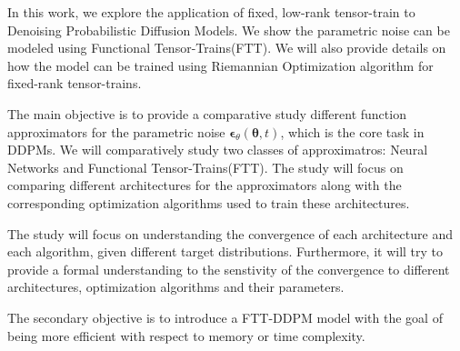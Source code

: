 \documentclass[11pt]{article}
\begin{document}
    In this work, we explore the application of fixed, low-rank tensor-train to Denoising Probabilistic Diffusion Models.
    We show the parametric noise can be modeled using Functional Tensor-Trains(FTT).
    We will also provide details on how the model can be trained using Riemannian Optimization algorithm for fixed-rank
    tensor-trains.\par
    The main objective is to provide a comparative study different function approximators for the
    parametric noise $\bm{\epsilon}_{\theta}(\bm{\theta},t)$, which is the core task in DDPMs.
    We will comparatively study two classes of approximatros: Neural Networks and Functional Tensor-Trains(FTT).
    The study will focus on comparing different architectures for the approximators along with the corresponding
    optimization algorithms used to train these architectures.\par

    The study will focus on understanding the convergence of each architecture and each algorithm, given different
    target distributions.
    Furthermore, it will try to provide a formal understanding to the senstivity of the convergence
    to different architectures, optimization algorithms and their parameters.

    The secondary objective is to introduce a FTT-DDPM model with the goal of being more efficient with respect to
    memory or time complexity.
\end{document}

